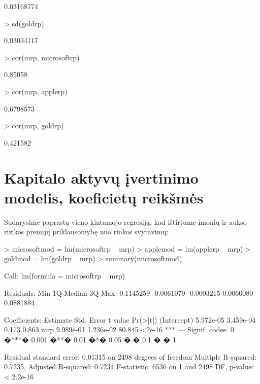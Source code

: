 \documentclass[a4paper]{article}
\begin{document}
\begin{Schunk}
\begin{Soutput}
[1] 0.03168774
\end{Soutput}
\begin{Sinput}
> sd(goldrp)
\end{Sinput}
\begin{Soutput}
[1] 0.03034117
\end{Soutput}
\begin{Sinput}
> cor(mrp, microsoftrp)
\end{Sinput}
\begin{Soutput}
[1] 0.85058
\end{Soutput}
\begin{Sinput}
> cor(mrp, applerp)
\end{Sinput}
\begin{Soutput}
[1] 0.6798573
\end{Soutput}
\begin{Sinput}
> cor(mrp, goldrp)
\end{Sinput}
\begin{Soutput}
[1] 0.421582
\end{Soutput}

\section{Kapitalo aktyvų įvertinimo modelis, koeficietų reikšmės}
Sudarysime paprastą vieno kintamojo regresiją, kad ištirtume įmonių ir aukso rizikos premijų priklausomybę nuo rinkos
svyravimų:

\begin{Sinput}
> microsoftmod = lm(microsoftrp ~ mrp)
> applemod = lm(applerp ~ mrp)
> goldmod = lm(goldrp ~ mrp)
> summary(microsoftmod)
\end{Sinput}
\begin{Soutput}
Call:
lm(formula = microsoftrp ~ mrp)

Residuals:
       Min         1Q     Median         3Q        Max 
-0.1145259 -0.0061079 -0.0003215  0.0060080  0.0881884 

Coefficients:
             Estimate Std. Error t value Pr(>|t|)    
(Intercept) 5.972e-05  3.459e-04   0.173    0.863    
mrp         9.989e-01  1.236e-02  80.845   <2e-16 ***
---
Signif. codes:  0 �***� 0.001 �**� 0.01 �*� 0.05 �.� 0.1 � � 1 

Residual standard error: 0.01315 on 2498 degrees of freedom
Multiple R-squared: 0.7235,	Adjusted R-squared: 0.7234 
F-statistic:  6536 on 1 and 2498 DF,  p-value: < 2.2e-16 
\end{Soutput}


\end{Schunk}
\end{document}
